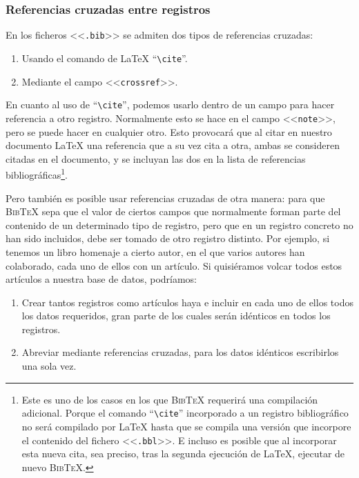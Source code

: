 \documentclass[a4paper,11pt]{article}
\def\btx-{\textsc{Bib\TeX}}
\def\ltx-{\LaTeX}
\def\ltr#1-{<<\texttt{#1}>>}
\def\tpf#1-{\ltr.#1-}
\def\cmd#1-{``\texttt{\textbackslash#1}''}
\begin{document}
\subsubsection{Referencias cruzadas entre registros}
\label{sec:refer-cruz-entre}

En los ficheros \tpf bib- se admiten dos tipos de referencias cruzadas:

\begin{enumerate}

\item Usando el comando de \ltx- \cmd cite-.

\item Mediante el campo \ltr crossref-.

\end{enumerate}

En cuanto al uso  de \cmd cite-, podemos usarlo dentro de  un campo para hacer
referencia a otro  registro. Normalmente esto se hace en  el campo \ltr note-,
pero se puede hacer en cualquier otro.  Esto provocará que al citar en nuestro
documento \ltx- una  referencia que a su vez cita a  otra, ambas se consideren
citadas en  el documento,  y se incluyan  las dos  en la lista  de referencias
bibliográficas\footnote{Este es  uno de los  casos en los que  \btx- requerirá
  una compilación  adicional. Porque  el comando \cmd  cite- incorporado  a un
  registro bibliográfico no será compilado  por \ltx- hasta que se compila una
  versión  que incorpore el  contenido del  fichero \tpf  bbl-.  E  incluso es
  posible  que al incorporar  esta nueva  cita, sea  preciso, tras  la segunda
  ejecución de \ltx-, ejecutar de nuevo \btx-.}.

Pero también  es posible  usar referencias cruzadas  de otra manera:  para que
\btx- sepa  que el valor  de ciertos campos  que normalmente forman  parte del
contenido de un determinado tipo de registro, pero que en un registro concreto
no  han  sido incluidos,  debe  ser tomado  de  otro  registro distinto.   Por
ejemplo, si tenemos un libro homenaje a cierto autor, en el que varios autores
han  colaborado, cada uno  de ellos  con un  artículo.  Si  quisiéramos volcar
todos estos artículos a nuestra base de datos, podríamos:

\begin{enumerate}

\item Crear  tantos registros  como artículos  haya e incluir  en cada  uno de
  ellos todos los  datos requeridos, gran parte de  los cuales serán idénticos
  en todos los registros.

\item  Abreviar  mediante  referencias  cruzadas,  para  los  datos  idénticos
  escribirlos una sola vez.

\end{enumerate}
\end{document}

